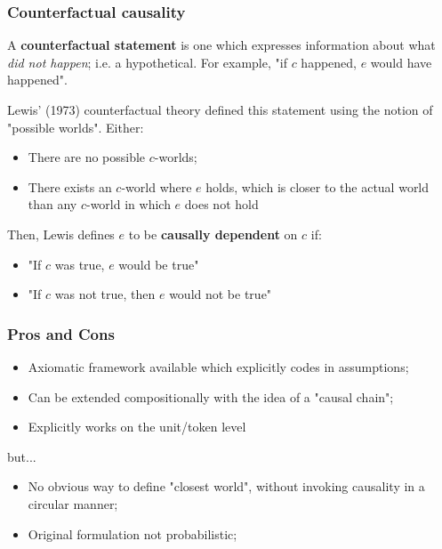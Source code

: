 \documentclass[handout]{beamer}
\begin{document}
\begin{frame}
\frametitle{Counterfactual causality}

A \textbf{counterfactual statement} is one which expresses information about what \textit{did not happen}; i.e. a hypothetical. For example, "if $c$ happened, $e$ would have happened". \pause
\medskip

Lewis' (1973) counterfactual theory defined this statement using the notion of "possible worlds". Either: \pause
\begin{itemize}
	\item There are no possible $c$-worlds;
	\pause
	\item There exists an $c$-world where $e$ holds, which is closer to the actual world than any $c$-world in which $e$ does not hold
	\pause
\end{itemize}

Then, Lewis defines $e$ to be \textbf{causally dependent} on $c$ if:
\pause
\begin{itemize}
	\item "If $c$ was true, $e$ would be true"
	\pause
	\item "If $c$ was not true, then $e$ would not be true"
\end{itemize}


\end{frame}

\begin{frame}
\frametitle{Pros and Cons}
\begin{itemize}
	\item Axiomatic framework available which explicitly codes in assumptions;
	\item Can be extended compositionally with the idea of a "causal chain";
	\item Explicitly works on the unit/token level
\end{itemize}

but...

\begin{itemize}
	\item No obvious way to define "closest world", without invoking causality in a circular manner;
	\item Original formulation not probabilistic;
\end{itemize}

\end{frame}
\end{document}
